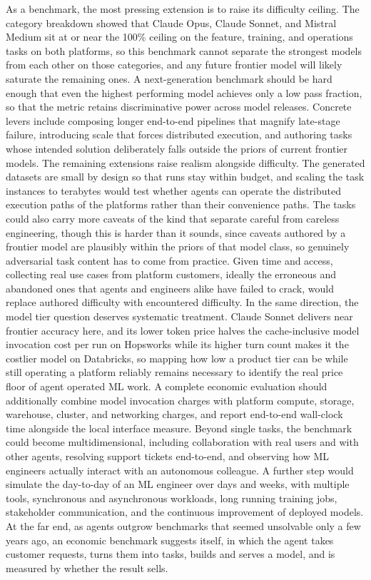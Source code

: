\documentclass[
english,                 %
bibtex,                  %
]{kththesis}
\numberwithin{listing}{chapter}
\begin{document}
As a benchmark, the most pressing extension is to raise its difficulty ceiling. The category breakdown showed that Claude Opus, Claude Sonnet, and Mistral Medium sit at or near the 100\% ceiling on the feature, training, and operations tasks on both platforms, so this benchmark cannot separate the strongest models from each other on those categories, and any future frontier model will likely saturate the remaining ones. A next-generation benchmark should be hard enough that even the highest performing model achieves only a low pass fraction, so that the metric retains discriminative power across model releases. Concrete levers include composing longer end-to-end pipelines that magnify late-stage failure, introducing scale that forces distributed execution, and authoring tasks whose intended solution deliberately falls outside the priors of current frontier models. The remaining extensions raise realism alongside difficulty. The generated datasets are small by design so that runs stay within budget, and scaling the task instances to terabytes would test whether agents can operate the distributed execution paths of the platforms rather than their convenience paths. The tasks could also carry more caveats of the kind that separate careful from careless engineering, though this is harder than it sounds, since caveats authored by a frontier model are plausibly within the priors of that model class, so genuinely adversarial task content has to come from practice. Given time and access, collecting real use cases from platform customers, ideally the erroneous and abandoned ones that agents and engineers alike have failed to crack, would replace authored difficulty with encountered difficulty. In the same direction, the model tier question deserves systematic treatment. Claude Sonnet delivers near frontier accuracy here, and its lower token price halves the cache-inclusive model invocation cost per run on Hopsworks while its higher turn count makes it the costlier model on Databricks, so mapping how low a product tier can be while still operating a platform reliably remains necessary to identify the real price floor of agent operated \gls{ML} work. A complete economic evaluation should additionally combine model invocation charges with platform compute, storage, warehouse, cluster, and networking charges, and report end-to-end wall-clock time alongside the local interface measure. Beyond single tasks, the benchmark could become multidimensional, including collaboration with real users and with other agents, resolving support tickets end-to-end, and observing how \gls{ML} engineers actually interact with an autonomous colleague. A further step would simulate the day-to-day of an \gls{ML} engineer over days and weeks, with multiple tools, synchronous and asynchronous workloads, long running training jobs, stakeholder communication, and the continuous improvement of deployed models. At the far end, as agents outgrow benchmarks that seemed unsolvable only a few years ago, an economic benchmark suggests itself, in which the agent takes customer requests, turns them into tasks, builds and serves a model, and is measured by whether the result sells.
\end{document}
